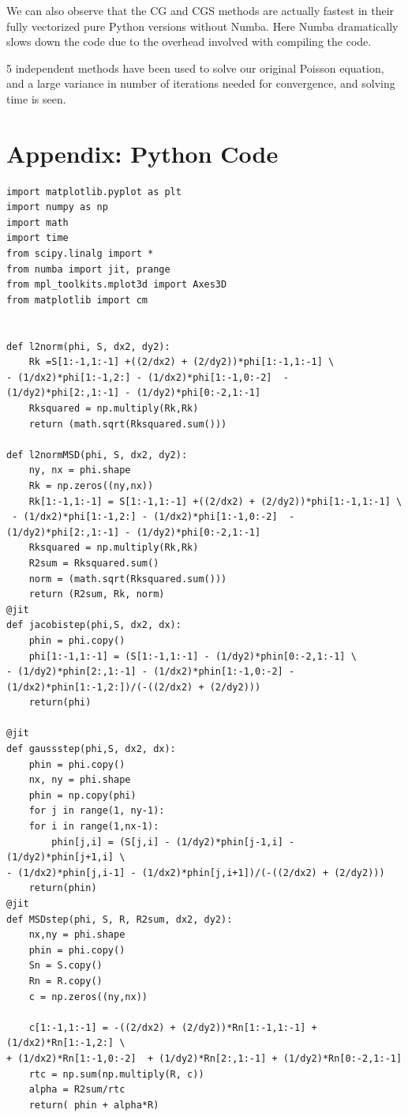 \documentclass[11pt]{article}
\begin{document}
We can also observe that the CG and CGS methods are actually fastest in their fully vectorized pure Python versions without Numba. Here Numba dramatically slows down the code due to the overhead involved with compiling the code. 

5 independent methods have been used to solve our original Poisson equation, and a large variance in number of iterations needed for convergence, and solving time is seen.

\newpage
\section{Appendix: Python Code}
\label{sec-2}
\begin{verbatim}
import matplotlib.pyplot as plt
import numpy as np
import math
import time
from scipy.linalg import *
from numba import jit, prange
from mpl_toolkits.mplot3d import Axes3D
from matplotlib import cm


def l2norm(phi, S, dx2, dy2):
    Rk =S[1:-1,1:-1] +((2/dx2) + (2/dy2))*phi[1:-1,1:-1] \
- (1/dx2)*phi[1:-1,2:] - (1/dx2)*phi[1:-1,0:-2]  - (1/dy2)*phi[2:,1:-1] - (1/dy2)*phi[0:-2,1:-1] 
    Rksquared = np.multiply(Rk,Rk)
    return (math.sqrt(Rksquared.sum()))

def l2normMSD(phi, S, dx2, dy2):
    ny, nx = phi.shape
    Rk = np.zeros((ny,nx))
    Rk[1:-1,1:-1] = S[1:-1,1:-1] +((2/dx2) + (2/dy2))*phi[1:-1,1:-1] \
 - (1/dx2)*phi[1:-1,2:] - (1/dx2)*phi[1:-1,0:-2]  - (1/dy2)*phi[2:,1:-1] - (1/dy2)*phi[0:-2,1:-1] 
    Rksquared = np.multiply(Rk,Rk)
    R2sum = Rksquared.sum()
    norm = (math.sqrt(Rksquared.sum()))
    return (R2sum, Rk, norm)
@jit
def jacobistep(phi,S, dx2, dx):
    phin = phi.copy()
    phi[1:-1,1:-1] = (S[1:-1,1:-1] - (1/dy2)*phin[0:-2,1:-1] \
- (1/dy2)*phin[2:,1:-1] - (1/dx2)*phin[1:-1,0:-2] - (1/dx2)*phin[1:-1,2:])/(-((2/dx2) + (2/dy2)))
    return(phi)

@jit
def gaussstep(phi,S, dx2, dx):
    phin = phi.copy()
    nx, ny = phi.shape
    phin = np.copy(phi)
    for j in range(1, ny-1):
	for i in range(1,nx-1):
	    phin[j,i] = (S[j,i] - (1/dy2)*phin[j-1,i] - (1/dy2)*phin[j+1,i] \
- (1/dx2)*phin[j,i-1] - (1/dx2)*phin[j,i+1])/(-((2/dx2) + (2/dy2)))
    return(phin)
@jit
def MSDstep(phi, S, R, R2sum, dx2, dy2):
    nx,ny = phi.shape
    phin = phi.copy()
    Sn = S.copy()
    Rn = R.copy()
    c = np.zeros((ny,nx))

    c[1:-1,1:-1] = -((2/dx2) + (2/dy2))*Rn[1:-1,1:-1] + (1/dx2)*Rn[1:-1,2:] \
+ (1/dx2)*Rn[1:-1,0:-2]  + (1/dy2)*Rn[2:,1:-1] + (1/dy2)*Rn[0:-2,1:-1]
    rtc = np.sum(np.multiply(R, c))
    alpha = R2sum/rtc
    return( phin + alpha*R)



\end{verbatim}
\end{document}
